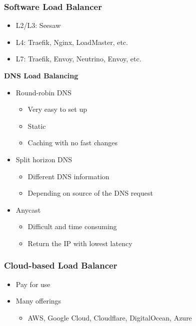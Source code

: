 \subsubsection{Software Load Balancer}
\begin{itemize}
    \item L2/L3: Seesaw
    \item L4: Traefik, Nginx, LoadMaster, etc.
    \item L7: Traefik, Envoy, Neutrino, Envoy, etc.
\end{itemize}
\textbf{DNS Load Balancing}
\begin{itemize}
    \item Round-robin DNS
    \begin{itemize}
        \item Very easy to set up
        \item Static
        \item Caching with no fast changes
    \end{itemize}
    \item Split horizon DNS
    \begin{itemize}
        \item Different DNS information
        \item Depending on source of the DNS request
    \end{itemize}
    \item Anycast
    \begin{itemize}
        \item Difficult and time consuming
        \item Return the IP with lowest latency
    \end{itemize}
\end{itemize}

\subsubsection{Cloud-based Load Balancer}
\begin{itemize}
    \item Pay for use
    \item Many offerings
    \begin{itemize}
        \item AWS, Google Cloud, Cloudflare, DigitalOcean, Azure
    \end{itemize}
\end{itemize}

